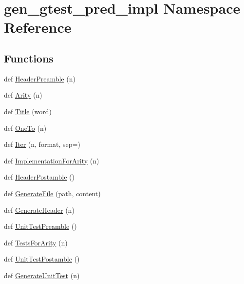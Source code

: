 \hypertarget{namespacegen__gtest__pred__impl}{}\section{gen\+\_\+gtest\+\_\+pred\+\_\+impl Namespace Reference}
\label{namespacegen__gtest__pred__impl}
\subsection*{Functions}
\begin{DoxyCompactItemize}
\item 
def \mbox{\hyperlink{namespacegen__gtest__pred__impl_a0b99cadcffab4bf161654a382163bac8}{Header\+Preamble}} (n)
\item 
def \mbox{\hyperlink{namespacegen__gtest__pred__impl_a5bbb7272f3588b969ab3ded6f49836a1}{Arity}} (n)
\item 
def \mbox{\hyperlink{namespacegen__gtest__pred__impl_ae49dd9bd9152dbcb3ca7994ce04c37ba}{Title}} (word)
\item 
def \mbox{\hyperlink{namespacegen__gtest__pred__impl_a7920598d51c9dded76a4ef9ffde339e4}{One\+To}} (n)
\item 
def \mbox{\hyperlink{namespacegen__gtest__pred__impl_ac016218b7c9437d1d5ac85c574c83069}{Iter}} (n, format, sep=\textquotesingle{}\textquotesingle{})
\item 
def \mbox{\hyperlink{namespacegen__gtest__pred__impl_a8c53b141b89f9c05d0131d9756dfeab0}{Implementation\+For\+Arity}} (n)
\item 
def \mbox{\hyperlink{namespacegen__gtest__pred__impl_a3d40c7ef70cf4d46e56c9612f34027bf}{Header\+Postamble}} ()
\item 
def \mbox{\hyperlink{namespacegen__gtest__pred__impl_a16210fe365dfd176e04aa2578ac5a8d9}{Generate\+File}} (path, content)
\item 
def \mbox{\hyperlink{namespacegen__gtest__pred__impl_a6f3039a82a5283846fb272f8a3af6743}{Generate\+Header}} (n)
\item 
def \mbox{\hyperlink{namespacegen__gtest__pred__impl_ae52dc86461d1b666c7b658a8c27c69f9}{Unit\+Test\+Preamble}} ()
\item 
def \mbox{\hyperlink{namespacegen__gtest__pred__impl_ab0da913fa15e5695d5bb2dd1de5dec57}{Tests\+For\+Arity}} (n)
\item 
def \mbox{\hyperlink{namespacegen__gtest__pred__impl_a57b922f50d0807896496dcd883c1f098}{Unit\+Test\+Postamble}} ()
\item 
def \mbox{\hyperlink{namespacegen__gtest__pred__impl_acbd42b5b7fb7ddbb06a4dd58fc37e9ed}{Generate\+Unit\+Test}} (n)
\end{DoxyCompactItemize}
